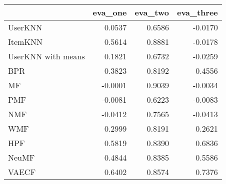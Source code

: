 \begin{tabular}{lrrr}
\toprule
{} &  eva\_one &  eva\_two &  eva\_three \\
\midrule
UserKNN            &   0.0537 &   0.6586 &    -0.0170 \\
ItemKNN            &   0.5614 &   0.8881 &    -0.0178 \\
UserKNN with means &   0.1821 &   0.6732 &    -0.0259 \\
BPR                &   0.3823 &   0.8192 &     0.4556 \\
MF                 &  -0.0001 &   0.9039 &    -0.0034 \\
PMF                &  -0.0081 &   0.6223 &    -0.0083 \\
NMF                &  -0.0412 &   0.7565 &    -0.0413 \\
WMF                &   0.2999 &   0.8191 &     0.2621 \\
HPF                &   0.5819 &   0.8390 &     0.6836 \\
NeuMF              &   0.4844 &   0.8385 &     0.5586 \\
VAECF              &   0.6402 &   0.8574 &     0.7376 \\
\bottomrule
\end{tabular}
